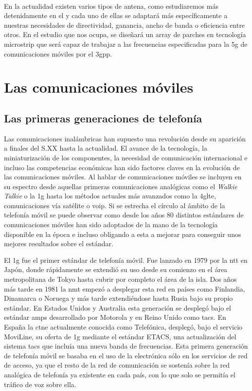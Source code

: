 \\ 
\par En la actualidad existen varios tipos de antena, como estudiaremos más detenidamente en el  y cada uno de ellas se adaptará más específicamente a nuestras necesidades de directividad, ganancia, ancho de banda o eficiencia entre otros. En el estudio que nos ocupa, se diseñará un array de parches en tecnología microstrip que será capaz de trabajar a las frecuencias especificadas para la \gls{5g} de comunicaciones móviles por el \gls{3gpp}.

\section{Las comunicaciones móviles}
\subsection{Las primeras generaciones de telefonía}
\par Las comunicaciones inalámbricas han supuesto una revolución desde su aparición a finales del S.XX hasta la actualidad. El avance de la tecnología, la miniaturización de los componentes, la necesidad de comunicación internacional e incluso las competencias económicas han sido factores claves en la evolución de las comunicaciones móviles. Al hablar de comunicaciones móviles se incluyen en su espectro desde aquellas primeras comunicaciones analógicas como el \textit{Walkie Talkie} o la \gls{1g} hasta los métodos actuales más avanzados como la \gls{4glte}, comunicaciones vía satélite o \gls{voip}. Si se estrecha el círculo al ámbito de la telefonía móvil se puede observar como desde los años 80 distintos estándares de comunicaciones móviles han sido adoptados de la mano de la tecnología disponible en la época e incluso obligando a esta a mejorar para conseguir unos mejores resultados sobre el estándar. 
\\
\par El \gls{1g} fue el primer estándar de telefonía móvil. Fue lanzado en 1979 por la \gls{ntt} en Japón, donde rápidamente se extendió su uso desde su comienzo en el área metropolitana de Tokyo hasta cubrir por completo el área de la isla. Dos años más tarde en 1981 la \gls{nmt} empezó a desplegar esta red en países como Finlandia, Dinamarca o Noruega y más tarde extendiéndose hasta Rusia bajo su propio estándar. En Estados Unidos y Australia esta generación se desplegó bajo el estándar \gls{amps} desarrollado por Motorola y en Reino Unido como \gls{tacs}. En España la \gls{ctne} actualmente conocida como Telefónica, desplegó, bajo el servicio MoviLine, su oferta de \gls{1g} mediante el estándar ETACS, una actualización del sistema \gls{tacs} que incluía una nueva banda de frecuencias. Esta primera generación de telefonía móvil se basaba en el uso de la electrónica sólo en los servicios de red de acceso, ya que el resto de la red de comunicación se sostenía sobre la red analógica de telefonía ya existente en cada país, con lo que solo se permitía el tráfico de voz sobre ella.

